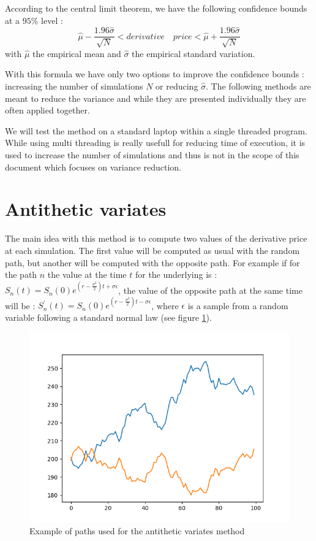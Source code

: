 \documentclass[hidelinks]{article}
\begin{document}
	According to the central limit theorem, we have the following confidence bounds at a $95\%$ level :
	$$\hat{\mu}-\frac{1.96\hat{\sigma}}{\sqrt{N}}<derivative\quad price<\hat{\mu}+\frac{1.96\hat{\sigma}}{\sqrt{N}}$$
	with $\hat{\mu}$ the empirical mean and $\hat{\sigma}$ the empirical standard variation.
	
	With this formula we have only two options to improve the confidence bounds : increasing the number of simulations $N$ or reducing $\hat{\sigma}$. The following methods are meant to reduce the variance and while they are presented individually they are often applied together.
	
	We will test the method on a standard laptop within a single threaded program. While using multi threading is really usefull for reducing time of execution, it is used to increase the number of simulations and thus is not in the scope of this document which focuses on variance reduction.
	
	\newpage
	\section{Antithetic variates}
	The main idea with this method is to compute two values of the derivative price at each simulation. The first value will be computed as usual with the random path, but another will be computed with the opposite path. For example if for the path $n$ the value at the time $t$ for the underlying is : $S_n (t)=S_n(0)e^{(r-\frac{\sigma^2}{2})t+\sigma\epsilon}$, the value of the opposite path at the same time will be : $S_n^{'}(t)=S_n(0)e^{(r-\frac{\sigma^2}{2})t-\sigma\epsilon}$, where $\epsilon$ is a sample from a random variable following a standard normal law (see figure \ref{fig:opposite}).
	\begin{figure}[!h]
				\centering
				\includegraphics[width=0.8\linewidth]{opposite_path.png}
				\caption{Example of paths used for the antithetic variates method}
				\label{fig:opposite}
				\end{figure}
	
\end{document}
